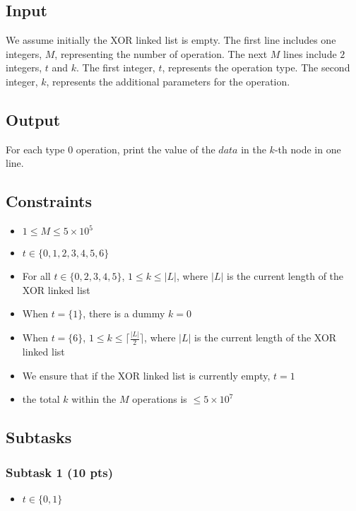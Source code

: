 \subsection{Input}\label{input}

We assume initially the XOR linked list is empty. The first line includes one integers, $M$, representing the number of operation. The next $M$ lines include $2$ integers, $t$ and $k$. The first integer, $t$, represents the operation type. The second integer, $k$, represents the additional parameters for the operation.

\subsection{Output}\label{output}

For each type $0$ operation, print the value of the $data$ in the $k$-th node in one line.

\subsection{Constraints}\label{constraint}

\begin{itemize}
    \item $1\leq M\leq 5\times 10^5$
    \item $t\in \{0, 1, 2, 3, 4, 5, 6\}$
    \item For all $t\in \{0, 2, 3, 4, 5\}$, $1\leq k\leq |L|$, where $|L|$ is the current length of the XOR linked list
    \item When $t = \{1\}$, there is a dummy $k=0$
    \item When $t = \{6\}$, $1\leq k\leq \lceil{\frac{|L|}{2}}\rceil$, where $|L|$ is the current length of the XOR linked list
    \item We ensure that if the XOR linked list is currently empty, $t = 1$
    \item the total $k$ within the $M$ operations is $\leq 5\times 10^7$
\end{itemize}

\subsection*{Subtasks}
\subsubsection{Subtask 1 (10 pts)}\label{subtask-1}
\begin{itemize}
\item $t\in \{0, 1\}$
\end{itemize}

